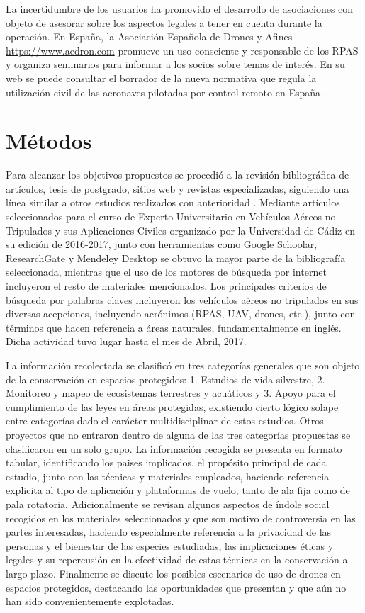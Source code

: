 \documentclass[11pt,]{article}
\begin{document}
La incertidumbre de los usuarios ha promovido el desarrollo de
asociaciones con objeto de asesorar sobre los aspectos legales a tener
en cuenta durante la operación. En España, la Asociación Española de
Drones y Afines \url{https://www.aedron.com} promueve un uso consciente
y responsable de los RPAS y organiza seminarios para informar a los
socios sobre temas de interés. En su web se puede consultar el borrador
de la nueva normativa que regula la utilización civil de las aeronaves
pilotadas por control remoto en España \citep{Aedron2017}.

\section{Métodos}\label{metodos}

Para alcanzar los objetivos propuestos se procedió a la revisión
bibliográfica de artículos, tesis de postgrado, sitios web y revistas
especializadas, siguiendo una línea similar a otros estudios realizados
con anterioridad \citet{Linchant2015}. Mediante artículos seleccionados
para el curso de Experto Universitario en Vehículos Aéreos no Tripulados
y sus Aplicaciones Civiles organizado por la Universidad de Cádiz en su
edición de 2016-2017, junto con herramientas como Google Schoolar,
ResearchGate y Mendeley Desktop se obtuvo la mayor parte de la
bibliografía seleccionada, mientras que el uso de los motores de
búsqueda por internet incluyeron el resto de materiales mencionados. Los
principales criterios de búsqueda por palabras claves incluyeron los
vehículos aéreos no tripulados en sus diversas acepciones, incluyendo
acrónimos (RPAS, UAV, drones, etc.), junto con términos que hacen
referencia a áreas naturales, fundamentalmente en inglés. Dicha
actividad tuvo lugar hasta el mes de Abril, 2017.

La información recolectada se clasificó en tres categorías generales que
son objeto de la conservación en espacios protegidos: 1. Estudios de
vida silvestre, 2. Monitoreo y mapeo de ecosistemas terrestres y
acuáticos y 3. Apoyo para el cumplimiento de las leyes en áreas
protegidas, existiendo cierto lógico solape entre categorías dado el
carácter multidisciplinar de estos estudios. Otros proyectos que no
entraron dentro de alguna de las tres categorías propuestas se
clasificaron en un solo grupo. La información recogida se presenta en
formato tabular, identificando los paises implicados, el propósito
principal de cada estudio, junto con las técnicas y materiales
empleados, haciendo referencia explicita al tipo de aplicación y
plataformas de vuelo, tanto de ala fija como de pala rotatoria.
Adicionalmente se revisan algunos aspectos de índole social recogidos en
los materiales seleccionados y que son motivo de controversia en las
partes interesadas, haciendo especialmente referencia a la privacidad de
las personas y el bienestar de las especies estudiadas, las
implicaciones éticas y legales y su repercusión en la efectividad de
estas técnicas en la conservación a largo plazo. Finalmente se discute
los posibles escenarios de uso de drones en espacios protegidos,
destacando las oportunidades que presentan y que aún no han sido
convenientemente explotadas.
\end{document}
